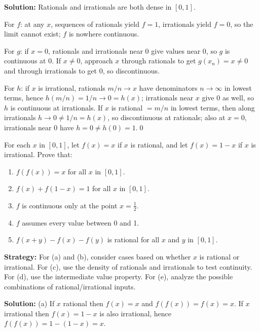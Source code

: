 \bigskip\noindent\textbf{Solution:}
Rationals and irrationals are both dense in $[0,1]$.

For $f$: at any $x$, sequences of rationals yield $f=1$, irrationals yield $f=0$, so the limit cannot exist; $f$ is nowhere continuous.

For $g$: if $x=0$, rationals and irrationals near $0$ give values near $0$, so $g$ is continuous at $0$. If $x\ne0$, approach $x$ through rationals to get $g(x_n)=x\ne 0$ and through irrationals to get $0$, so discontinuous.

For $h$: if $x$ is irrational, rationals $m/n\to x$ have denominators $n\to\infty$ in lowest terms, hence $h(m/n)=1/n\to 0=h(x)$; irrationals near $x$ give $0$ as well, so $h$ is continuous at irrationals. If $x$ is rational $=m/n$ in lowest terms, then along irrationals $h\to 0\ne 1/n=h(x)$, so discontinuous at rationals; also at $x=0$, irrationals near $0$ have $h=0\ne h(0)=1$.\qed



\begin{problembox}
\begin{problemstatement}
For each \( x \) in \([0, 1]\), let \( f(x) = x \) if \( x \) is rational, and let \( f(x) = 1 - x \) if \( x \) is irrational. Prove that:
\begin{enumerate}[label=(\alph*)]
\item \( f(f(x)) = x \) for all \( x \) in \([0, 1]\).
\item \( f(x) + f(1 - x) = 1 \) for all \( x \) in \([0, 1]\).
\item \( f \) is continuous only at the point \( x = \frac{1}{2} \).
\item \( f \) assumes every value between 0 and 1.
\item \( f(x + y) - f(x) - f(y) \) is rational for all \( x \) and \( y \) in \([0, 1]\).
\end{enumerate}
\end{problemstatement}
\end{problembox}

\noindent\textbf{Strategy:} For (a) and (b), consider cases based on whether $x$ is rational or irrational. For (c), use the density of rationals and irrationals to test continuity. For (d), use the intermediate value property. For (e), analyze the possible combinations of rational/irrational inputs.

\bigskip\noindent\textbf{Solution:}
(a) If $x$ rational then $f(x)=x$ and $f(f(x))=f(x)=x$. If $x$ irrational then $f(x)=1-x$ is also irrational, hence $f(f(x))=1-(1-x)=x$.

